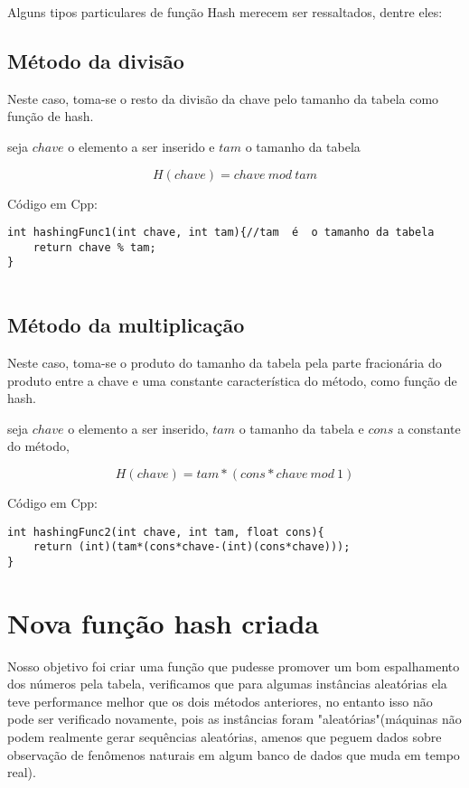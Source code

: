 \documentclass[a4paper]{report}
\begin{document}
Alguns tipos particulares de função Hash merecem ser ressaltados, dentre eles:

\subsection{Método da divisão}

Neste caso, toma-se o resto da divisão da chave pelo  tamanho da tabela como função de hash.

seja $chave$ o elemento a ser inserido e $tam$ o tamanho da tabela

$$H(chave)=chave\ mod\ tam$$

Código em Cpp:

\begin{verbatim}
int hashingFunc1(int chave, int tam){//tam  é  o tamanho da tabela
    return chave % tam;
}


\end{verbatim}
\subsection{Método da multiplicação}

Neste caso, toma-se o produto do tamanho da tabela pela parte fracionária do produto entre a chave e uma constante característica do método, como função de hash.

seja $chave$ o elemento a ser inserido, $tam$ o tamanho da tabela e $cons$ a constante do método,

$$H(chave)=tam*(cons*chave\ mod \ 1)$$

Código em Cpp:

\begin{verbatim}
int hashingFunc2(int chave, int tam, float cons){
    return (int)(tam*(cons*chave-(int)(cons*chave)));
}

\end{verbatim}

\section{Nova função hash criada}

Nosso objetivo foi criar uma função que pudesse promover um bom espalhamento dos números pela tabela, verificamos que para algumas instâncias aleatórias ela teve performance melhor que os dois métodos anteriores, no entanto isso não pode ser verificado novamente, pois as instâncias foram "aleatórias"(máquinas não podem realmente gerar sequências aleatórias, amenos que peguem dados sobre observação de fenômenos naturais em algum banco de dados que muda em tempo real).
\end{document}
